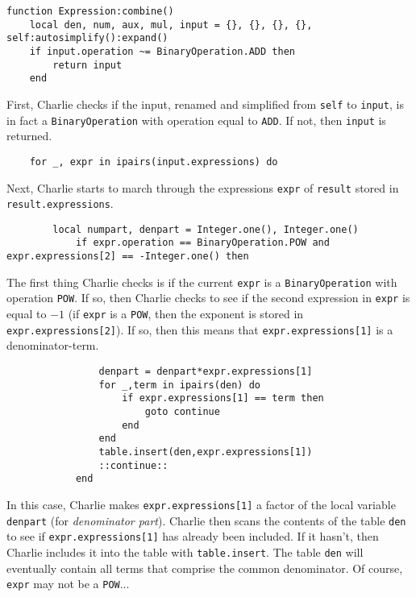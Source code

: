 \documentclass{article}
\begin{document}
\begin{verbatim}
function Expression:combine()
    local den, num, aux, mul, input = {}, {}, {}, {}, self:autosimplify():expand()
    if input.operation ~= BinaryOperation.ADD then 
        return input
    end
\end{verbatim}

First, Charlie checks if the input, renamed and simplified from \texttt{self} to \texttt{input}, is in fact a \texttt{BinaryOperation} with operation equal to \texttt{ADD}. If not, then \texttt{input} is returned.

\begin{verbatim}
    for _, expr in ipairs(input.expressions) do
\end{verbatim}

Next, Charlie starts to march through the expressions \texttt{expr} of \texttt{result} stored in \texttt{result.expressions}. 

\begin{verbatim}
        local numpart, denpart = Integer.one(), Integer.one()
            if expr.operation == BinaryOperation.POW and expr.expressions[2] == -Integer.one() then 
\end{verbatim}
The first thing Charlie checks is if the current \texttt{expr} is a \texttt{BinaryOperation} with operation \texttt{POW}. If so, then Charlie checks to see if the second expression in \texttt{expr} is equal to $-1$ (if \texttt{expr} is a \texttt{POW}, then the exponent is stored in \texttt{expr.expressions[2]}). If so, then this means that \texttt{expr.expressions[1]} is a denominator-term.

\begin{verbatim}
                denpart = denpart*expr.expressions[1]
                for _,term in ipairs(den) do 
                    if expr.expressions[1] == term then 
                        goto continue
                    end
                end
                table.insert(den,expr.expressions[1])
                ::continue::
            end
\end{verbatim}

In this case, Charlie makes \texttt{expr.expressions[1]} a factor of the local variable \texttt{denpart} (for \emph{denominator part}). Charlie then scans the contents of the table \texttt{den} to see if \texttt{expr.expressions[1]} has already been included. If it hasn't, then Charlie includes it into the table with \texttt{table.insert}. The table \texttt{den} will eventually contain all terms that comprise the common denominator. Of course, \texttt{expr} may not be a \texttt{POW}...
\end{document}
